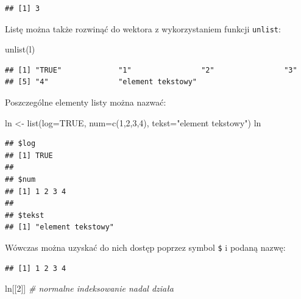 \documentclass[
]{book}
\newenvironment{Shaded}{\begin{snugshade}}{\end{snugshade}}
\newcommand{\AttributeTok}[1]{\textcolor[rgb]{0.77,0.63,0.00}{#1}}
\newcommand{\CommentTok}[1]{\textcolor[rgb]{0.56,0.35,0.01}{\textit{#1}}}
\newcommand{\ConstantTok}[1]{\textcolor[rgb]{0.00,0.00,0.00}{#1}}
\newcommand{\DecValTok}[1]{\textcolor[rgb]{0.00,0.00,0.81}{#1}}
\newcommand{\FunctionTok}[1]{\textcolor[rgb]{0.00,0.00,0.00}{#1}}
\newcommand{\NormalTok}[1]{#1}
\newcommand{\OtherTok}[1]{\textcolor[rgb]{0.56,0.35,0.01}{#1}}
\newcommand{\SpecialCharTok}[1]{\textcolor[rgb]{0.00,0.00,0.00}{#1}}
\newcommand{\StringTok}[1]{\textcolor[rgb]{0.31,0.60,0.02}{#1}}
\begin{document}
\begin{verbatim}
## [1] 3
\end{verbatim}

Listę można także rozwinąć do wektora z wykorzystaniem funkcji \texttt{unlist}:

\begin{Shaded}
\begin{Highlighting}[]
\FunctionTok{unlist}\NormalTok{(l)}
\end{Highlighting}
\end{Shaded}

\begin{verbatim}
## [1] "TRUE"             "1"                "2"                "3"               
## [5] "4"                "element tekstowy"
\end{verbatim}

Poszczególne elementy listy można nazwać:

\begin{Shaded}
\begin{Highlighting}[]
\NormalTok{ln }\OtherTok{\textless{}{-}} \FunctionTok{list}\NormalTok{(}\AttributeTok{log=}\ConstantTok{TRUE}\NormalTok{, }\AttributeTok{num=}\FunctionTok{c}\NormalTok{(}\DecValTok{1}\NormalTok{,}\DecValTok{2}\NormalTok{,}\DecValTok{3}\NormalTok{,}\DecValTok{4}\NormalTok{), }\AttributeTok{tekst=}\StringTok{"element tekstowy"}\NormalTok{)}
\NormalTok{ln}
\end{Highlighting}
\end{Shaded}

\begin{verbatim}
## $log
## [1] TRUE
## 
## $num
## [1] 1 2 3 4
## 
## $tekst
## [1] "element tekstowy"
\end{verbatim}

Wówczas można uzyskać do nich dostęp poprzez symbol \texttt{\$} i podaną nazwę:

\begin{Shaded}
\end{Shaded}

\begin{verbatim}
## [1] 1 2 3 4
\end{verbatim}

\begin{Shaded}
\begin{Highlighting}[]
\NormalTok{ln[[}\DecValTok{2}\NormalTok{]] }\CommentTok{\# normalne indeksowanie nadal działa}
\end{Highlighting}
\end{Shaded}
\end{document}
